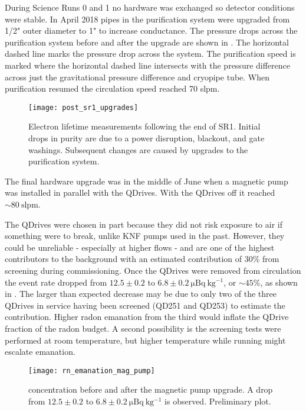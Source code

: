 During Science Runs 0 and 1 no hardware was exchanged so detector conditions were stable.  In April 2018 pipes in the purification
system were upgraded from 1/2" outer diameter to 1" to increase conductance.  The pressure drops across the purification system before and
after the upgrade are shown in
.  The horizontal dashed line
marks the pressure drop across the system.  The purification speed is marked where the horizontal dashed line intersects with the
pressure difference across just the gravitational pressure difference and cryopipe tube.  When purification resumed the
circulation speed reached 70 slpm.

\begin{figure}
\centering
\texttt{[image: post\_sr1\_upgrades]}
\caption{Electron lifetime measurements following the end of SR1.  Initial drops in purity are due to a power disruption, blackout, and gate
washings.  Subsequent changes are caused by upgrades to the purification system.}
\label{fig:electron_lifetime_model_ops_post_sr1}
\end{figure}

The final hardware upgrade was in the middle of June when a magnetic pump  was installed in parallel with the
QDrives.  With the QDrives off it reached ${\sim} 80\ \mathrm{slpm}$.

The QDrives were chosen in part because they did not risk exposure to air if something were to
break, unlike KNF pumps used in the past.  However, they could be unreliable - especially at higher flows - and
are one of the highest contributors to the 
background with an estimated contribution of 30\% from screening during commissioning.  Once the QDrives were removed from circulation the
 event rate dropped from $12.5 \pm 0.2$ to
$6.8 \pm 0.2\ \mathrm{\mu Bq\ kg^{-1}}$, or ${\sim} 45\%$, as shown in .  The larger
than expected decrease may be due to only two of the three QDrives in service having been screened (QD251 and QD253) to estimate the
contribution.  Higher radon emanation from the third would inflate
the QDrive fraction of the radon budget.  A second possibility is the screening tests were performed at room temperature, but higher
temperature while running might escalate emanation.

\begin{figure}
\centering
\texttt{[image: rn\_emanation\_mag\_pump]}
\caption{ concentration before and after the magnetic pump upgrade.  A drop from
$12.5 \pm 0.2$ to $6.8 \pm 0.2\ \mathrm{\mu Bq\ kg^{-1}}$ is observed.  Preliminary plot.}
\label{fig:electron_lifetime_model_ops_rn_emanation}
\end{figure}

